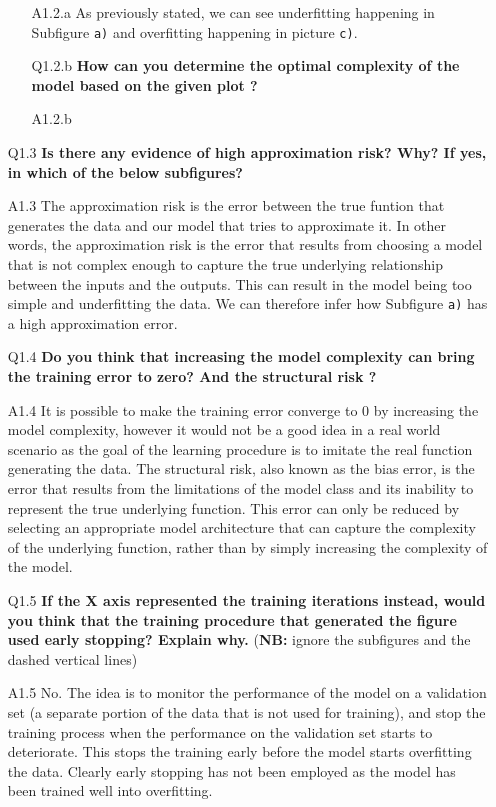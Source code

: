 \documentclass[tikz,14pt,fleqn]{article}
\begin{document}
\begin{itemize}
\begin{itemize}
\item[A1.2.a] As previously stated, we can see underfitting happening in Subfigure \verb|a)| and overfitting happening in picture \verb|c)|.
\item[Q1.2.b] \textbf{How can you determine the optimal complexity of the model based on the given plot ?}
\item[A1.2.b] %
\end{itemize}
\item[Q1.3] \textbf{Is there any evidence of high approximation risk? Why? If yes, in which of the below subfigures?} 
\item[A1.3] The approximation risk is the error between the true funtion that generates the data and our model that tries to approximate it. In other words, the approximation risk is the error that results from choosing a model that is not complex enough to capture the true underlying relationship between the inputs and the outputs. This can result in the model being too simple and underfitting the data. We can therefore infer how Subfigure \verb|a)| has a high approximation error.
\item[Q1.4] \textbf{Do you think that increasing the model complexity can bring the training error to zero? And the structural risk ?}
\item[A1.4] It is possible to make the training error converge to 0 by increasing the model complexity, however it would not be a good idea in a real world scenario as the goal of the learning procedure is to imitate the real function generating the data. The structural risk, also known as the bias error, is the error that results from the limitations of the model class and its inability to represent the true underlying function. This error can only be reduced by selecting an appropriate model architecture that can capture the complexity of the underlying function, rather than by simply increasing the complexity of the model.
\item[Q1.5] \textbf{If the X axis represented the training iterations instead, would you think that the training procedure that generated the figure used early stopping? Explain why.} (\textbf{NB:} ignore the subfigures and the dashed vertical lines)
\item[A1.5]  No. The idea is to monitor the performance of the model on a validation set (a separate portion of the data that is not used for training), and stop the training process when the performance on the validation set starts to deteriorate. This stops the training early before the model starts overfitting the data. Clearly early stopping has not been employed as the model has been trained well into overfitting.
\end{itemize}
\end{document}
